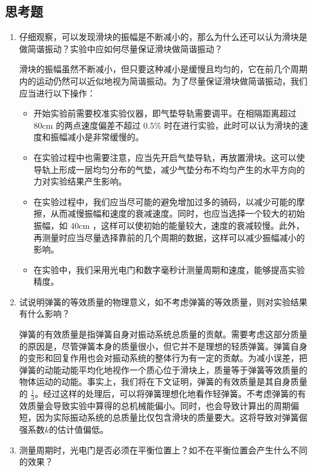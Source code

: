 \documentclass[zihao=5, UTF8]{article}
\theoremstyle{MyLineTheoremStyle} %
\theoremstyle{MyBlockTheoremStyle} %
\theoremstyle{MySubsubsectionStyle} %
\begin{document}
\subsection{思考题}
\begin{enumerate}
    \item 仔细观察，可以发现滑块的振幅是不断减小的，那么为什么还可以认为滑块是做简谐振动？实验中应如何尽量保证滑块做简谐振动？
    
        滑块的振幅虽然不断减小，但只要这种减小是缓慢且均匀的，它在前几个周期内的运动仍然可以近似地视为简谐振动。为了尽量保证滑块做简谐振动，我们应当进行以下操作：
        \begin{itemize}
            \item 开始实验前需要校准实验仪器，即气垫导轨需要调平。在相隔距离超过 80cm 的两点速度偏差不超过 $0.5 \%$ 时在进行实验，此时可以认为滑块的速度和振幅减小是非常缓慢的。
            \item 在实验过程中也需要注意，应当先开启气垫导轨，再放置滑块。这可以使导轨上形成一层均匀分布的气垫，减少气垫分布不均匀产生的水平方向的力对实验结果产生影响。
            \item 在实验过程中，我们应当尽可能的避免增加过多的骑码，以减少可能的摩擦，从而减慢振幅和速度的衰减速度。同时，也应当选择一个较大的初始振幅，如 40cm ，这样可以使初始的能量较大，速度的衰减较慢。此外，再测量时应当尽量选择靠前的几个周期的数据，这样可以减少振幅减小的影响。
            \item 在实验中，我们采用光电门和数字毫秒计测量周期和速度，能够提高实验精度。
        \end{itemize}

    \item 试说明弹簧的等效质量的物理意义，如不考虑弹簧的等效质量，则对实验结果有什么影响？
    
        弹簧的有效质量是指弹簧自身对振动系统总质量的贡献。需要考虑这部分质量的原因是，尽管弹簧本身的质量很小，但它并不是理想的轻质弹簧。弹簧自身的变形和回复作用也会对振动系统的整体行为有一定的贡献。为减小误差，把弹簧的动能动能平均化地视作一个质心位于滑块上，质量等于弹簧等效质量的物体运动的动能。事实上，我们将在下文证明，弹簧的有效质量是其自身质量的 $\frac{1}{3}$。经过这样的处理后，可以将弹簧理想化地看作轻弹簧。不考虑弹簧的有效质量会导致实验中算得的总机械能偏小。同时，也会导致计算出的周期偏短，因为实际振动系统的总质量比仅包含滑块的质量要大。这将导致对弹簧倔强系数$k$的估计值偏低。
        
    \item 测量周期时，光电门是否必须在平衡位置上？如不在平衡位置会产生什么不同的效果？
    

\end{enumerate}
\end{document}

